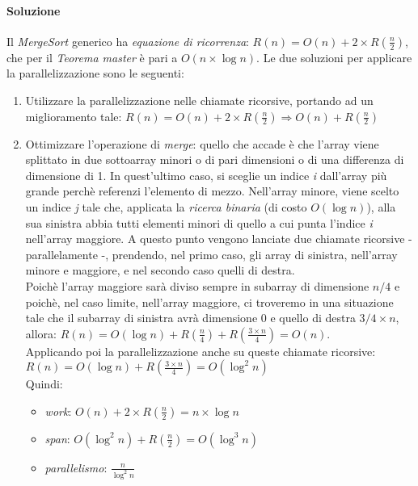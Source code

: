 \paragraph{Soluzione}
Il \textit{MergeSort} generico ha \textit{equazione di ricorrenza}: $R(n) = O(n) + 2\times R(\frac{n}{2})$, che per il \textit{Teorema master} \`e pari a $O(n\times \log n)$.
Le due soluzioni per applicare la parallelizzazione sono le seguenti:
\begin{enumerate}
	\item Utilizzare la parallelizzazione nelle chiamate ricorsive, portando ad un miglioramento tale: $R(n) = O(n) + 2\times R(\frac{n}{2}) \Rightarrow O(n) + R(\frac{n}{2})$
	\item Ottimizzare l'operazione di \textit{merge}: quello che accade \`e che l'array viene splittato in due sottoarray minori o di pari dimensioni o di una differenza di dimensione di 1. In quest'ultimo caso, si sceglie un indice \textit{i} dall'array pi\`u grande perch\`e referenzi l'elemento di mezzo. Nell'array minore, viene scelto un indice \textit{j} tale che, applicata la \textit{ricerca binaria} (di costo $O(\log n)$), alla sua sinistra abbia tutti elementi minori di quello a cui punta l'indice \textit{i} nell'array maggiore. A questo punto vengono lanciate due chiamate ricorsive - parallelamente -, prendendo, nel primo caso, gli array di sinistra, nell'array minore e maggiore, e nel secondo caso quelli di destra. \\
	Poich\`e l'array maggiore sar\`a diviso sempre in subarray di dimensione $n/4$ e poich\`e, nel caso limite, nell'array maggiore, ci troveremo in una situazione tale che il subarray di sinistra avr\`a dimensione $0$ e quello di destra $3/4 \times n$, allora: $R(n) = O(\log n) + R(\frac{n}{4}) + R(\frac{3\times n}{4}) = O(n)$. \\
	Applicando poi la parallelizzazione anche su queste chiamate ricorsive: $R(n) = O(\log n) + R(\frac{3\times n}{4}) = O(\log^2 n)$ \\
	Quindi:
	\begin{itemize}
		\item \textit{work}: $O(n) + 2\times R(\frac{n}{2}) = n \times \log n$
		\item \textit{span}: $O(\log^2 n) + R(\frac{n}{2}) = O(\log^3 n)$
		\item \textit{parallelismo}: $\frac{n}{\log^2 n}$
	\end{itemize}
\end{enumerate}

\newpage

